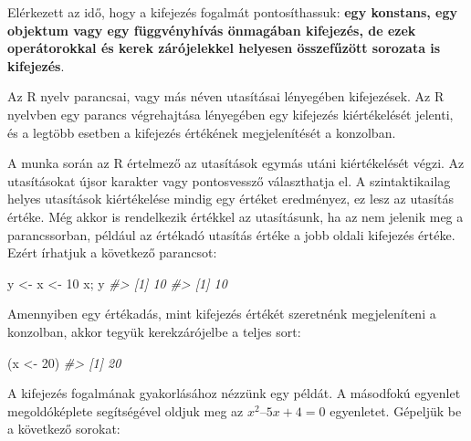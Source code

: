 \documentclass[
]{book}
\newenvironment{Shaded}{\begin{snugshade}}{\end{snugshade}}
\newcommand{\CommentTok}[1]{\textcolor[rgb]{0.56,0.35,0.01}{\textit{#1}}}
\newcommand{\DecValTok}[1]{\textcolor[rgb]{0.00,0.00,0.81}{#1}}
\newcommand{\NormalTok}[1]{#1}
\newcommand{\OtherTok}[1]{\textcolor[rgb]{0.56,0.35,0.01}{#1}}
\begin{document}
Elérkezett az idő, hogy a kifejezés fogalmát pontosíthassuk: \textbf{egy konstans, egy objektum vagy egy függvényhívás önmagában kifejezés, de ezek operátorokkal és kerek zárójelekkel helyesen összefűzött sorozata is kifejezés}.

Az R nyelv parancsai, vagy más néven utasításai lényegében kifejezések. Az R nyelvben egy parancs végrehajtása lényegében egy kifejezés kiértékelését jelenti, és a legtöbb esetben a kifejezés értékének megjelenítését a konzolban.

A munka során az R értelmező az utasítások egymás utáni kiértékelését végzi. Az utasításokat újsor karakter vagy pontosvessző választhatja el. A szintaktikailag helyes utasítások kiértékelése mindig egy értéket eredményez, ez lesz az utasítás értéke. Még akkor is rendelkezik értékkel az utasításunk, ha az nem jelenik meg a parancssorban, például az értékadó utasítás értéke a jobb oldali kifejezés értéke. Ezért írhatjuk a következő parancsot:

\begin{Shaded}
\begin{Highlighting}[]
\NormalTok{y }\OtherTok{\textless{}{-}}\NormalTok{ x }\OtherTok{\textless{}{-}} \DecValTok{10}
\NormalTok{x; y}
\CommentTok{\#\textgreater{} [1] 10}
\CommentTok{\#\textgreater{} [1] 10}
\end{Highlighting}
\end{Shaded}

Amennyiben egy értékadás, mint kifejezés értékét szeretnénk megjeleníteni a konzolban, akkor tegyük kerekzárójelbe a teljes sort:

\begin{Shaded}
\begin{Highlighting}[]
\NormalTok{(x }\OtherTok{\textless{}{-}} \DecValTok{20}\NormalTok{)}
\CommentTok{\#\textgreater{} [1] 20}
\end{Highlighting}
\end{Shaded}

A kifejezés fogalmának gyakorlásához nézzünk egy példát. A másodfokú egyenlet megoldóképlete segítségével oldjuk meg az \(x^{2}–5x+4=0\) egyenletet. Gépeljük be a következő sorokat:
\end{document}

